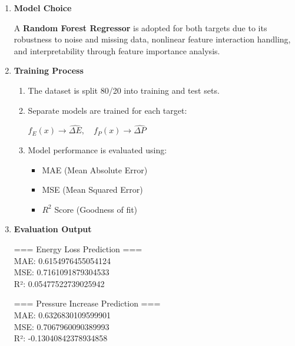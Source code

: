 \documentclass[12pt, a4paper]{article}
\begin{document}
            \begin{enumerate}
                \item \textbf{Model Choice}

                    A \textbf{Random Forest Regressor} is adopted for both targets due to its robustness to noise and missing data, nonlinear feature interaction handling, and interpretability through feature importance analysis.

                \item \textbf{Training Process}

                    \begin{enumerate}
                        \item The dataset is split 80/20 into training and test sets.
                        \item Separate models are trained for each target:
                        
                            \begin{center}
                                $f_E(x) \rightarrow \widehat{\Delta E}, \quad f_P(x) \rightarrow \widehat{\Delta P}$
                            \end{center}
                        
                        \item Model performance is evaluated using:
                        
                            \begin{itemize}
                                \item MAE (Mean Absolute Error)
                                \item MSE (Mean Squared Error)
                                \item $R^2$ Score (Goodness of fit)
                            \end{itemize}
                    \end{enumerate}

                \item \textbf{Evaluation Output}

                    === Energy Loss Prediction === \\
                    MAE: 0.6154976455054124 \\
                    MSE: 0.7161091879304533 \\
                    R²: 0.05477522739025942 
            
                    === Pressure Increase Prediction === \\
                    MAE: 0.6326830109599901 \\
                    MSE: 0.7067960090389993 \\
                    R²: -0.13040842378934858 \\
                    
            \end{enumerate}
    
\end{document}
